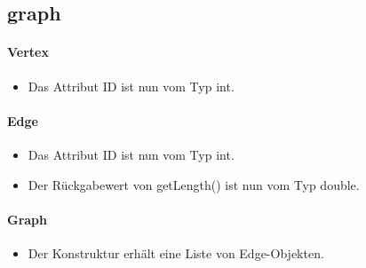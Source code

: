 \subsection{graph}
\paragraph{Vertex}
\begin{itemize}
 \item Das Attribut ID ist nun vom Typ int.
\end{itemize}

\paragraph{Edge}
\begin{itemize}
 \item Das Attribut ID ist nun vom Typ int.
 \item Der Rückgabewert von getLength() ist nun vom Typ double.
\end{itemize}

\paragraph{Graph}
\begin{itemize}
 \item Der Konstruktur erhält eine Liste von Edge-Objekten.
\end{itemize}
